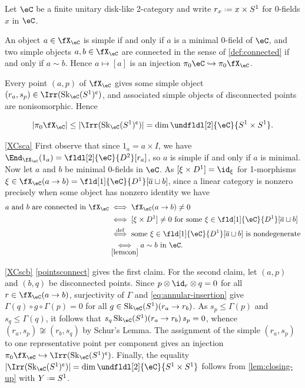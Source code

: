 \documentclass[12pt,reqno]{amsart}
\newcommand{\Sk}{\mathrm{Sk}}
\newcommand{\C}{\eC}
\newcommand{\fcj}[1]{\overline{#1}}
\newcommand{\cent}{\textup{\textcent}}
\newcommand{\itemstep}[1]{\smallskip\noindent\underline{#1}}
\renewcommand{\amalg}{\sqcup}
\DeclareRobustCommand{\coloneq}{\mathrel{\vcenter{\baselineskip0.5ex\lineskiplimit0pt\hbox{\scriptsize{\upshape.}}\hbox{\scriptsize{\upshape.}}}}=}
\begin{document}
\begin{lemma}
\label{lem:XC-simple-connected}
Let $\C$ be a finite unitary disk-like 2-category and write $r_x\coloneq x\times S^1$ for 0-fields $x$ in $\C$.
\begin{lst}
\item[(a)]\label{XCsca} An object $a\in\fX_\C$ is simple if and only
if $a$ is a minimal 0-field of $\C$, and two simple objects $a,b\in\fX_\C$ are connected in the
sense of \cref{def:connected} if and only if $a\sim b$. Hence $a\mapsto[a]$ is an injection $\pi_0\C\hookrightarrow\pi_0\fX_\C$.
\item[(b)]\label{XCscb} Every point $(a,p)$ of $\fX_\C$ gives some simple object $(r_a,s_p)\in\Irr(\Sk_\C(S^1)^\cent)$, and associated simple objects of disconnected points are nonisomorphic. Hence
\end{lst}
\[
|\pi_0\fX_\C|\leq|\Irr(\Sk_\C(S^1)^\cent)|=\dim\undfldl[2]{\C}{S^1\times S^1}.
\]
\end{lemma}
\begin{pf}
\itemstep{\ref{XCsca}}
First observe that since $1_a=a\times I$, we have $\End_{\fX_\C}(1_a)=\fldl[2]{\C}{D^2}[r_a]$, so $a$ is simple if and only if $a$ is minimal. Now let $a$ and $b$ be minimal 0-fields in $\C$. As $[\xi\times D^1]=\id_\xi$ for 1-morphisms $\xi\in\fX_\C(a\to b)=\fld[1]{\C}{D^1}[\fcj{a}\amalg b]$, since a linear category is nonzero precisely when some object has nonzero identity we have
\begin{align*}
\text{$a$ and $b$ are connected in $\fX_\C$}
&
\iff
\fX_\C(a\to b)\neq0 
\\&
\iff 
[\xi\times D^1]\neq0 \text{ for some $\xi\in\fld[1]{\C}{D^1}[\fcj a\amalg b]$}
\\&
\overset{\text{def}}{\iff}
\text{some $\xi\in\fld[1]{\C}{D^1}[\fcj a\amalg b]$ is nondegenerate}
\\&
\underset{\eqref{lemcon}}{\iff}
a\sim b\text{ in $\C$}.
\end{align*}

\itemstep{\ref{XCscb}}
\cref{pointsconnect} gives the first claim. For the second claim, let $(a,p)$ and $(b,q)$ be disconnected points. Since $p\otimes\id_r\otimes q=0$ for all $r\in\fX_\C(a\to b)$, surjectivity of $\Gamma$ and \eqref{eq:annular-insertion} give $\Gamma(q)\circ g\circ\Gamma(p)=0$ for all $g\in\Sk_\C(S^1)(r_a\to r_b)$. As $s_p\leq\Gamma(p)$ and $s_q\leq\Gamma(q)$, it follows that $s_q\,\Sk_\C(S^1)(r_a\to r_b)\,s_p=0$, whence $(r_a,s_p)\not\cong(r_b,s_q)$ by Schur's Lemma. The assignment of the simple $(r_a,s_p)$ to one representative point per component gives an injection $\pi_0\fX_\C\hookrightarrow\Irr(\Sk_\C(S^1)^\cent)$. Finally, the equality $|\Irr(\Sk_\C(S^1)^\cent)|=\dim\undfldl[2]{\C}{S^1\times S^1}$ follows from \cref{lem:closing-up} with $Y\coloneq S^1$.
\end{pf}
\end{document}
